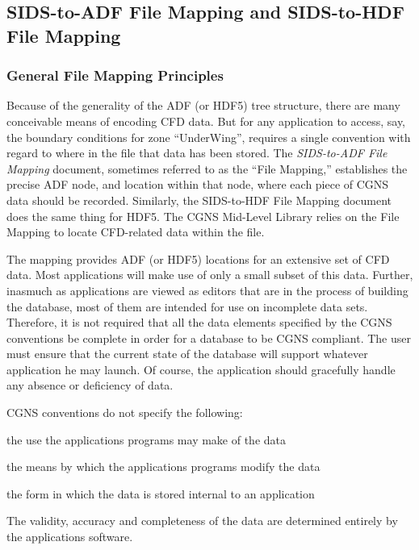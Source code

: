 \subsection{SIDS-to-ADF File Mapping and SIDS-to-HDF File Mapping}

\subsubsection{General File Mapping Principles}

Because of the generality of the ADF (or HDF5) tree structure, there are
many conceivable means of encoding CFD data.
But for any application to access, say, the boundary conditions for zone
``UnderWing'', requires a single convention with regard to where in the
file that data has been stored.
The \textit{SIDS-to-ADF File Mapping} document, sometimes referred to
as the ``File Mapping,'' establishes the precise ADF node, and location
within that node, where each piece of CGNS data should be recorded.
Similarly, the SIDS-to-HDF File Mapping document does the same thing for
HDF5.
The CGNS Mid-Level Library relies on the File Mapping to locate
CFD-related data within the file.

The mapping provides ADF (or HDF5) locations for an extensive set of CFD
data.
Most applications will make use of only a small subset of this data.
Further, inasmuch as applications are viewed as editors that are in the
process of building the database, most of them are intended for use on
incomplete data sets.
Therefore, it is not required that all the data elements specified by
the CGNS conventions be complete in order for a database to be CGNS
compliant.
The user must ensure that the current state of the database will support
whatever application he may launch.
Of course, the application should gracefully handle any absence or
deficiency of data.

CGNS conventions do not specify the following:

\begin{itemize*}
\item the use the applications programs may make of the data
\item the means by which the applications programs modify the data
\item the form in which the data is stored internal to an application
\end{itemize*}

\noindent
The validity, accuracy and completeness of the data are determined
entirely by the applications software.

